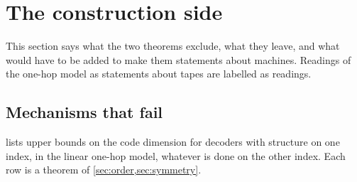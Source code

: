 \section{The construction side}\label{sec:construction}

This section says what the two theorems exclude, what they leave, and what would have to be added to make them
statements about machines. Readings of the one-hop model as statements about tapes are labelled as readings.

\subsection{Mechanisms that fail}\label{sec:fail}

 lists upper bounds on the code dimension for decoders with structure on one index, in the linear
one-hop model, whatever is done on the other index. Each row is a theorem of \cref{sec:order,sec:symmetry}.

